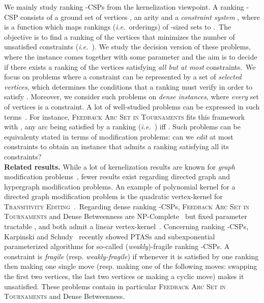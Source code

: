 \documentclass[11pt]{article}
\def\ie{{\em i.e.}~}
\newcommand{\BIT}{{\sc Dense Betweenness}}
\newcommand{\FAST}{\textsc{Feedback Arc Set in Tournaments}}
\begin{document}
We mainly study 
ranking -CSPs from the kernelization viewpoint. 
A ranking -CSP consists of a ground set of vertices , an arity 
 and a \emph{constraint system} , where  is a function which maps rankings (\ie orderings) of -sized sets  to .~The objective is to find a ranking   of the vertices 
that minimizes the number of unsatisfied constraints (\ie ). We study the decision version of these problems, where the instance comes together with some parameter  and the aim is to decide if there exists a ranking of the vertices satisfying \emph{all 
but at most } constraints.~We focus on problems where a constraint  
can be represented by a set of \emph{selected vertices}, which determines the conditions that 
a ranking must verify in order to satisfy . Moreover, we consider such problems 
on \emph{dense instances}, where \emph{every} set of  vertices is a constraint. 
A lot of well-studied problems can be expressed in such terms~\cite{ALS09, KS11}. 
For instance, \FAST{} fits this 
framework with , any arc  being satisfied by a ranking  (\ie ) iff . 
Such problems can be equivalenty stated in terms of  
modification problems: can we \emph{edit} at most  constraints to obtain an instance that admits a ranking satisfying all its constraints? \\



\noindent \textbf{Related results.} While a lot of kernelization results are known for \emph{graph} modification 
problems~\cite{BP11,KW09,Tho10,vBMN10}, fewer results exist regarding directed graph and hypergraph modification problems. 
An example of polynomial kernel for a directed graph modification problem is the 
quadratic vertex-kernel for \textsc{Transitivity Editing}~\cite{WKNU09}.~Regarding dense ranking -CSPs, \FAST{} and \BIT{} are NP-Complete~\cite{AA07,Alo06,CTY07} but fixed parameter tractable \cite{ALS09,KS10}, and both admit a linear vertex-kernel~\cite{PPT11}. Concerning ranking -CSPs, Karpinski and Schudy~\cite{KS11} recently showed PTASs and subexponential parameterized algorithms for so-called (\emph{weakly})-fragile ranking -CSPs. A constraint is \emph{fragile} (resp. \emph{weakly-fragile}) if whenever it is satisfied by one ranking then 
making one single move (resp. making one of the following moves: swapping the first two vertices, the last two vertices 
or making a cyclic move) makes it unsatisfied. These problems contain in particular \FAST{} and \BIT{}. \\
\end{document}
